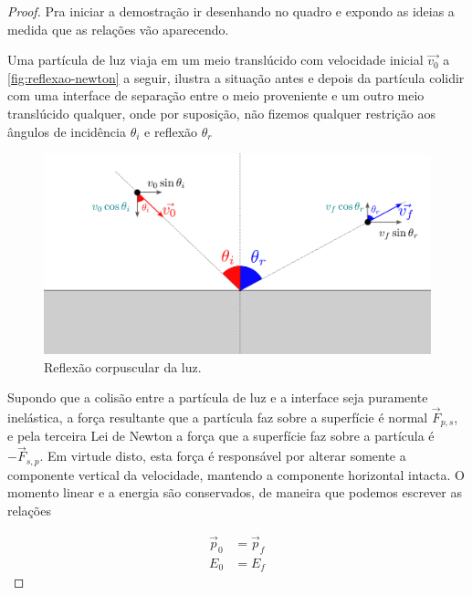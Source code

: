     \begin{proof}
        Pra iniciar a demostração ir desenhando no quadro e expondo as ideias a medida que as relações vão aparecendo.
        
        Uma partícula de luz viaja em um meio translúcido com velocidade inicial $\vec{v_0}$ a \autoref{fig:reflexao-newton} a seguir, ilustra a situação antes e depois da partícula colidir com uma interface de separação entre o meio proveniente e um outro meio translúcido qualquer, onde por suposição, não fizemos qualquer restrição aos ângulos de incidência $\theta_i$ e reflexão $\theta_r$
        
        \vspace*{20pt}
        \begin{figure}[!ht]
            \centering
            \includegraphics[width=.8\textwidth]{img/reflexao-newton.png}
            \caption{Reflexão corpuscular da luz.}
            \label{fig:reflexao-newton}
        \end{figure}
        \vspace*{20pt}
        
        Supondo que a colisão entre a partícula de luz e a interface seja puramente inelástica, a força resultante que a partícula faz sobre a superfície é normal $\vec{F}_{p,s}$, e pela terceira Lei de Newton a força que a superfície faz sobre a partícula é $-\vec{F}_{s,p}$. Em virtude disto, esta força é responsável por alterar somente a componente vertical da velocidade, mantendo a componente horizontal intacta. O momento linear e a energia são conservados, de maneira que podemos escrever as relações

        \begin{subequations}
            \begin{align}
                \vec{p}_0&=\vec{p}_f\\
                E_0&=E_f
            \end{align}
        \end{subequations}


\end{proof}
